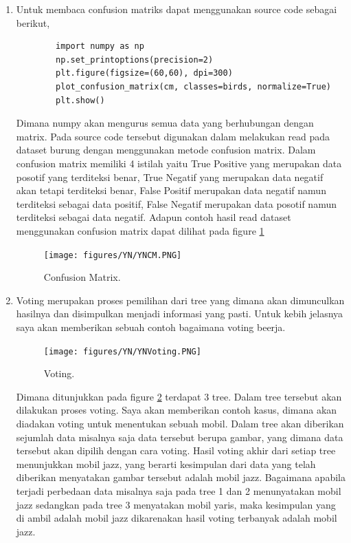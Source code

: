 \begin{enumerate}
\item Untuk membaca confusion matriks dapat menggunakan source code sebagai berikut,
	\begin{verbatim}
		import numpy as np
		np.set_printoptions(precision=2)
		plt.figure(figsize=(60,60), dpi=300)
		plot_confusion_matrix(cm, classes=birds, normalize=True)
		plt.show()
	\end{verbatim}

Dimana numpy akan mengurus semua data yang berhubungan dengan matrix. Pada source code tersebut digunakan dalam melakukan read pada dataset burung dengan menggunakan metode confusion matrix. Dalam confusion matrix memiliki 4 istilah yaitu True Positive yang merupakan data posotif yang terditeksi benar, True Negatif yang merupakan data negatif akan tetapi terditeksi benar, False Positif merupakan data negatif namun terditeksi sebagai data positif, False Negatif merupakan data posotif namun terditeksi sebagai data negatif. Adapun contoh hasil read dataset menggunakan confusion matrix dapat dilihat pada figure \ref{YNCM}
	
	\begin{figure}[ht]
	\centerline{\texttt{[image: figures/YN/YNCM.PNG]}}
	\caption{Confusion Matrix.}
	\label{YNCM}
	\end{figure}

\item Voting merupakan proses pemilihan dari tree yang dimana akan dimunculkan hasilnya dan disimpulkan menjadi informasi yang pasti. Untuk kebih jelasnya saya akan memberikan sebuah contoh bagaimana voting beerja.
	
	\begin{figure}[ht]
	\centerline{\texttt{[image: figures/YN/YNVoting.PNG]}}
	\caption{Voting.}
	\label{YNV}
	\end{figure}

Dimana ditunjukkan pada figure \ref{YNV} terdapat 3 tree. Dalam tree tersebut akan dilakukan proses voting. Saya akan memberikan contoh kasus, dimana akan diadakan voting untuk menentukan sebuah mobil. Dalam tree akan diberikan sejumlah data misalnya saja data tersebut berupa gambar, yang dimana data tersebut akan dipilih dengan cara voting. Hasil voting akhir dari setiap tree menunjukkan mobil jazz, yang berarti kesimpulan dari data yang telah diberikan menyatakan gambar tersebut adalah mobil jazz. Bagaimana apabila terjadi perbedaan data misalnya saja pada tree 1 dan 2 menunyatakan mobil jazz sedangkan pada tree 3 menyatakan mobil yaris, maka kesimpulan yang di ambil adalah mobil jazz dikarenakan hasil voting terbanyak adalah mobil jazz.

\end{enumerate}

